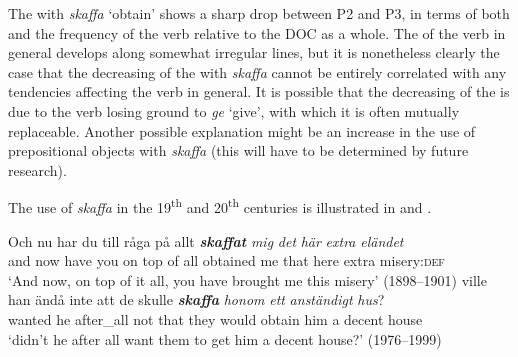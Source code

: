 \documentclass[output=paper]{langscibook}
\begin{document}
\label{sec:valdeson:5.3.3.5}

The  with \textit{skaffa} ‘obtain’ shows a sharp drop between P2 and P3, in terms of both  and the frequency of the verb relative to the DOC as a whole. The  of the verb in general develops along somewhat irregular lines, but it is nonetheless clearly the case that the decreasing  of the  with \textit{skaffa} cannot be entirely correlated with any tendencies affecting the verb in general. It is possible that the decreasing  of the  is due to the verb losing ground to \textit{ge} ‘give’, with which it is often mutually replaceable. Another possible explanation might be an increase in the use of prepositional objects with \textit{skaffa} (this will have to be determined by future research).


\begin{table}
\caption{Frequency measures of the verb-specific DOC with \textit{skaffa} ‘obtain’}
\label{tab:valdeson:18}
\end{table}

The use of \textit{skaffa} in the 19\textsuperscript{th} and 20\textsuperscript{th} centuries is illustrated in  and .


\ea \label{ex:valdeson:28}
\gll Och   nu   har   du   till     råga   på   allt \textbf{\textit{skaffat}} \textit{mig} \textit{det}     \textit{här}   \textit{extra} \textit{eländet}\\
  and     now have   you on   top   of       all   obtained   me  that    here    extra   misery:\textsc{def}\\
\glt `And now, on top of it all, you have brought me this misery’ (1898–1901)
\ex \label{ex:valdeson:29}
\gll ville     han ändå     inte    att    de   skulle \textbf{\textit{skaffa}} \textit{honom} \textit{ett}   \textit{anständigt}   \textit{hus}?\\
  wanted   he   after\_all not     that   they   would   obtain   him a   decent           house\\
\glt `didn’t he after all want them to get him a decent house?’ (1976–1999)
\z
\end{document}

